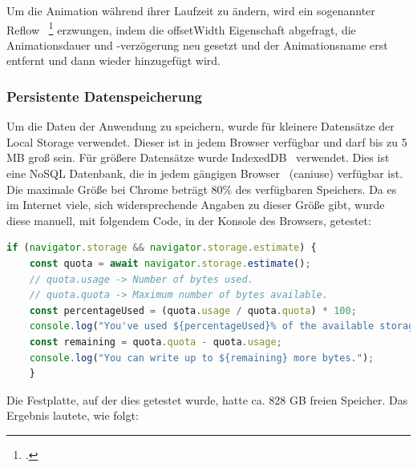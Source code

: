 \newline
\newline
Um die Animation während ihrer Laufzeit zu ändern, wird ein sogenannter Reflow ~\footcite{JavaScriptAnimationsReflow} erzwungen, indem die offsetWidth Eigenschaft abgefragt, die Animationsdauer und -verzögerung neu gesetzt und der Animationsname erst entfernt und dann wieder hinzugefügt wird.
\newline
\newline
\subsubsection{Persistente Datenspeicherung}
Um die Daten der Anwendung zu speichern, wurde für kleinere Datensätze der Local Storage verwendet.
Dieser ist in jedem Browser verfügbar und darf bis zu 5 MB groß sein.
\newline
\newline
Für größere Datensätze wurde IndexedDB~\cite{IndexedDB} verwendet.
Dies ist eine NoSQL Datenbank, die in jedem gängigen Browser~\cite{caniuse-indexedDB} (\gls{caniuse}) verfügbar ist.
Die maximale Größe bei Chrome beträgt 80\(\%\) des verfügbaren Speichers.
Da es im Internet viele, sich widersprechende Angaben zu dieser Größe gibt, wurde diese manuell, mit folgendem Code, in der Konsole des Browsers, getestet:
\newline
\newline
\begin{lstlisting}[language=javascript,label={lst:JavaScript IndexedDB Speichergröße}]
    if (navigator.storage && navigator.storage.estimate) {
    const quota = await navigator.storage.estimate();
    // quota.usage -> Number of bytes used.
    // quota.quota -> Maximum number of bytes available.
    const percentageUsed = (quota.usage / quota.quota) * 100;
    console.log("You've used ${percentageUsed}% of the available storage.");
    const remaining = quota.quota - quota.usage;
    console.log("You can write up to ${remaining} more bytes.");
    }
\end{lstlisting}
\newline
\newline
Die Festplatte, auf der dies getestet wurde, hatte ca. 828 GB freien Speicher.
Das Ergebnis lautete, wie folgt:
\newline
\newline
